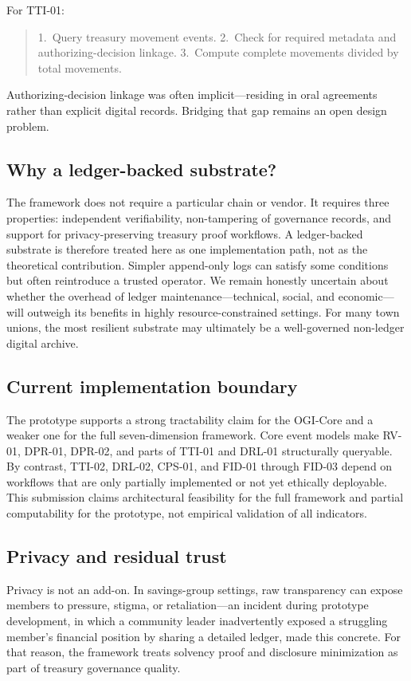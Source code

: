 \documentclass[sigconf,anonymous]{acmart}
\begin{document}
For TTI-01:
\begin{quote}
1.~Query treasury movement events.
2.~Check for required metadata and authorizing-decision linkage.
3.~Compute complete movements divided by total movements.
\end{quote}
Authorizing-decision linkage was often implicit---residing in oral agreements rather than explicit digital records. Bridging that gap remains an open design problem.

\subsection{Why a ledger-backed substrate?}

The framework does not require a particular chain or vendor. It requires three properties: independent verifiability, non-tampering of governance records, and support for privacy-preserving treasury proof workflows. A ledger-backed substrate is therefore treated here as one implementation path, not as the theoretical contribution. Simpler append-only logs can satisfy some conditions but often reintroduce a trusted operator. We remain honestly uncertain about whether the overhead of ledger maintenance---technical, social, and economic---will outweigh its benefits in highly resource-constrained settings. For many town unions, the most resilient substrate may ultimately be a well-governed non-ledger digital archive.

\subsection{Current implementation boundary}

The prototype supports a strong tractability claim for the OGI-Core and a weaker one for the full seven-dimension framework. Core event models make RV-01, DPR-01, DPR-02, and parts of TTI-01 and DRL-01 structurally queryable. By contrast, TTI-02, DRL-02, CPS-01, and FID-01 through FID-03 depend on workflows that are only partially implemented or not yet ethically deployable. This submission claims architectural feasibility for the full framework and partial computability for the prototype, not empirical validation of all indicators.

\subsection{Privacy and residual trust}

Privacy is not an add-on. In savings-group settings, raw transparency can expose members to pressure, stigma, or retaliation---an incident during prototype development, in which a community leader inadvertently exposed a struggling member's financial position by sharing a detailed ledger, made this concrete. For that reason, the framework treats solvency proof and disclosure minimization as part of treasury governance quality.
\end{document}
